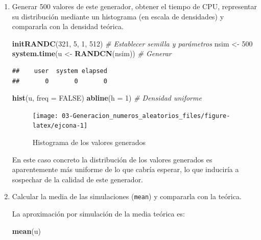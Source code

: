 \documentclass[
]{book}
\newenvironment{Shaded}{\begin{snugshade}}{\end{snugshade}}
\newcommand{\CommentTok}[1]{\textcolor[rgb]{0.56,0.35,0.01}{\textit{#1}}}
\newcommand{\DataTypeTok}[1]{\textcolor[rgb]{0.13,0.29,0.53}{#1}}
\newcommand{\DecValTok}[1]{\textcolor[rgb]{0.00,0.00,0.81}{#1}}
\newcommand{\KeywordTok}[1]{\textcolor[rgb]{0.13,0.29,0.53}{\textbf{#1}}}
\newcommand{\NormalTok}[1]{#1}
\newcommand{\OtherTok}[1]{\textcolor[rgb]{0.56,0.35,0.01}{#1}}
\newcommand{\StringTok}[1]{\textcolor[rgb]{0.31,0.60,0.02}{#1}}
\theoremstyle{break}
\theoremstyle{definition}
\theoremstyle{definition}
\theoremstyle{definition}
\theoremstyle{remark}
\begin{document}
\begin{enumerate}
\def\labelenumi{\alph{enumi})}
\item
  Generar 500 valores de este generador, obtener el tiempo de CPU,
  representar su distribución mediante un histograma (en escala
  de densidades) y compararla con la densidad teórica.

\begin{Shaded}
\begin{Highlighting}[]
\KeywordTok{initRANDC}\NormalTok{(}\DecValTok{321}\NormalTok{, }\DecValTok{5}\NormalTok{, }\DecValTok{1}\NormalTok{, }\DecValTok{512}\NormalTok{)       }\CommentTok{# Establecer semilla y parámetros}
\NormalTok{nsim <-}\StringTok{ }\DecValTok{500}
\KeywordTok{system.time}\NormalTok{(u <-}\StringTok{ }\KeywordTok{RANDCN}\NormalTok{(nsim))  }\CommentTok{# Generar}
\end{Highlighting}
\end{Shaded}

\begin{verbatim}
##    user  system elapsed 
##       0       0       0
\end{verbatim}

\begin{Shaded}
\begin{Highlighting}[]
\KeywordTok{hist}\NormalTok{(u, }\DataTypeTok{freq =} \OtherTok{FALSE}\NormalTok{)}
\KeywordTok{abline}\NormalTok{(}\DataTypeTok{h =} \DecValTok{1}\NormalTok{)                   }\CommentTok{# Densidad uniforme}
\end{Highlighting}
\end{Shaded}

  \begin{figure}[!htb]

  {\centering \texttt{[image: 03-Generacion\_numeros\_aleatorios\_files/figure-latex/ejcona-1]} 

  }

  \caption{Histograma de los valores generados}\label{fig:ejcona}
  \end{figure}

  En este caso concreto la distribución de los valores generados es aparentemente más uniforme de lo que cabría esperar, lo que induciría a sospechar de la calidad de este generador.
\item
  Calcular la media de las simulaciones (\texttt{mean}) y compararla con
  la teórica.

  La aproximación por simulación de la media teórica es:

\begin{Shaded}
\begin{Highlighting}[]
\KeywordTok{mean}\NormalTok{(u)}
\end{Highlighting}
\end{Shaded}


\end{enumerate}
\end{document}
